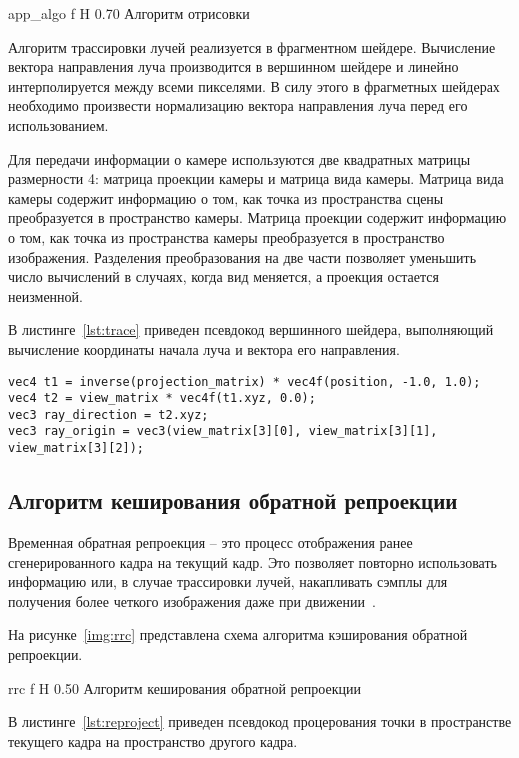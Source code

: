     {app_algo}
    {f}
    {H}
    {0.70\textwidth}
    {Алгоритм отрисовки}

Алгоритм трассировки лучей реализуется в фрагментном шейдере.
Вычисление вектора направления луча производится в вершинном
шейдере и линейно интерполируется между всеми пикселями. В силу этого 
в фрагметных шейдерах необходимо произвести нормализацию вектора направления луча
перед его использованием.

Для передачи информации о камере используются две квадратных матрицы размерности 4: матрица проекции камеры и матрица вида камеры. Матрица вида камеры содержит информацию о том, 
как точка из пространства сцены преобразуется в пространство камеры. Матрица проекции 
содержит информацию о том, как точка из пространства камеры преобразуется в пространство 
изображения. Разделения преобразования на две части позволяет уменьшить число вычислений 
в случаях, когда вид меняется, а проекция остается неизменной.

В листинге~\ref{lst:trace} приведен псевдокод вершинного шейдера, выполняющий вычисление
координаты начала луча и вектора его направления.

\begin{lstlisting}[caption={Вычисление координаты начала луча и вектора его направления},label={lst:trace},frame=single]
vec4 t1 = inverse(projection_matrix) * vec4f(position, -1.0, 1.0);
vec4 t2 = view_matrix * vec4f(t1.xyz, 0.0);
vec3 ray_direction = t2.xyz;
vec3 ray_origin = vec3(view_matrix[3][0], view_matrix[3][1], view_matrix[3][2]);
\end{lstlisting}

\subsection{Алгоритм кеширования обратной репроекции}

Временная обратная репроекция -- это процесс отображения ранее сгенерированного кадра на 
текущий кадр. Это позволяет повторно использовать информацию или, в случае трассировки 
лучей, накапливать сэмплы для получения более четкого изображения даже при 
движении~\cite{ARTSwRPC}.

На рисунке~\ref{img:rrc} представлена схема алгоритма кэширования обратной
репроекции.

    {rrc}
    {f}
    {H}
    {0.50\textwidth}
    {Алгоритм кеширования обратной репроекции}

В листинге~\ref{lst:reproject} приведен псевдокод процерования точки в пространстве 
текущего кадра на пространство другого кадра.

